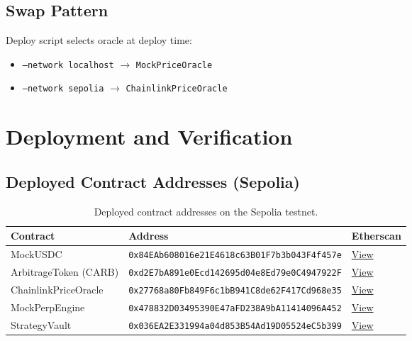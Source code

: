 \documentclass[11pt,a4paper]{article}
\begin{document}
\subsection{Swap Pattern}

Deploy script selects oracle at deploy time:
\begin{itemize}
    \item \texttt{--network localhost} $\rightarrow$ \texttt{MockPriceOracle}
    \item \texttt{--network sepolia} $\rightarrow$ \texttt{ChainlinkPriceOracle}
\end{itemize}

\section{Deployment and Verification}

\subsection{Deployed Contract Addresses (Sepolia)}

\begin{table}[h!]
\centering
\caption{Deployed contract addresses on the Sepolia testnet.}
\begin{tabular}{@{}lll@{}}
\toprule
\textbf{Contract} & \textbf{Address} & \textbf{Etherscan} \\
\midrule
MockUSDC
    & \texttt{0x84EAb608016e21E4618c63B01F7b3b043F4f457e}
    & \href{https://sepolia.etherscan.io/address/0x84EAb608016e21E4618c63B01F7b3b043F4f457e}{View} \\
ArbitrageToken (CARB)
    & \texttt{0xd2E7bA891e0Ecd142695d04e8Ed79e0C4947922F}
    & \href{https://sepolia.etherscan.io/address/0xd2E7bA891e0Ecd142695d04e8Ed79e0C4947922F}{View} \\
ChainlinkPriceOracle
    & \texttt{0x27768a80Fb849F6c1bB941C8de62F417Cd968e35}
    & \href{https://sepolia.etherscan.io/address/0x27768a80Fb849F6c1bB941C8de62F417Cd968e35}{View} \\
MockPerpEngine
    & \texttt{0x478832D03495390E47aFD238A9bA11414096A452}
    & \href{https://sepolia.etherscan.io/address/0x478832D03495390E47aFD238A9bA11414096A452}{View} \\
StrategyVault
    & \texttt{0x036EA2E331994a04d853B54Ad19D05524eC5b399}
    & \href{https://sepolia.etherscan.io/address/0x036EA2E331994a04d853B54Ad19D05524eC5b399}{View} \\
\bottomrule
\end{tabular}
\end{table}
\end{document}
